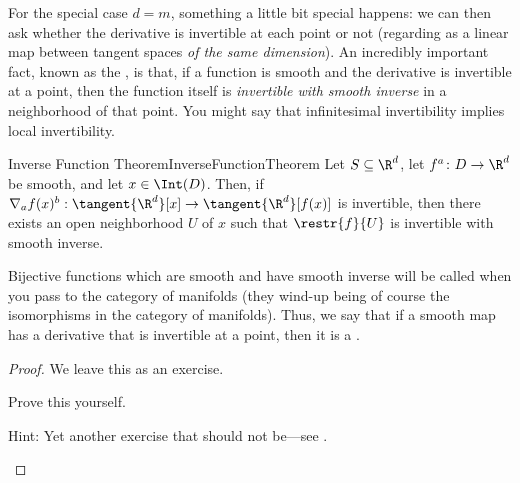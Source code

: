 For the special case $d=m$, something a little bit special happens:  we can then ask whether the derivative is invertible at each point or not (regarding as a linear map between tangent spaces \emph{of the same dimension}).  An incredibly important fact, known as the , is that, if a function is smooth and the derivative is invertible at a point, then the function itself is \emph{invertible with smooth inverse} in a neighborhood of that point.  You might say that infinitesimal invertibility implies local invertibility.
\begin{thm}{Inverse Function Theorem}{InverseFunctionTheorem}
Let $S\subseteq \R ^d$, let $f^a\colon D\rightarrow \R ^d$ be smooth, and let $x\in \Int (D)$.  Then, if $\nabla _af(x)^b:\tangent{\R ^d}[x]\rightarrow \tangent{\R ^d}[f(x)]$ is invertible, then there exists an open neighborhood $U$ of $x$ such that $\restr{f}{U}$ is invertible with smooth inverse.
\begin{rmk}
Bijective functions which are smooth and have smooth inverse will be called  when you pass to the category of manifolds (they wind-up being of course the isomorphisms in the category of manifolds).  Thus, we say that if a smooth map has a derivative that is invertible at a point, then it is a .
\end{rmk}
\begin{proof}
We leave this as an exercise.
\begin{exr}[breakable=false]{}{}
Prove this yourself.
\begin{rmk}
Hint:  Yet another exercise that should not be---see \cite[pg.~221]{Rudin}.
\end{rmk}
\end{exr}
\end{proof}
\end{thm}